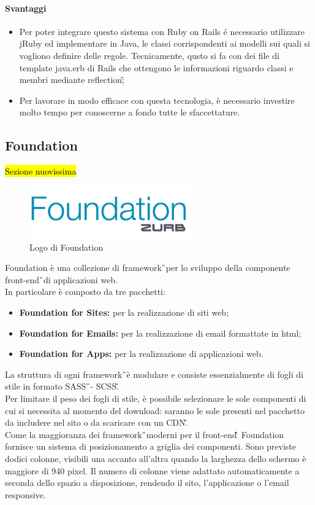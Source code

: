 \paragraph{Svantaggi}
	\begin{itemize}
		\item Per poter integrare questo sistema con Ruby on Rails é necessario utilizzare jRuby ed implementare in Java, le classi corrispondenti ai modelli sui quali si vogliono definire delle regole. Tecnicamente, qusto si fa con dei file di template java.erb di Rails che ottengono le informazioni riguardo classi e membri mediante \gls{reflection}\G;
		\item Per lavorare in modo efficace con questa tecnologia, è necessario investire molto tempo per conoscerne a fondo tutte le sfaccettature.
	\end{itemize}
\subsection{Foundation}
	\hl{Sezione nuovissima}
		\begin{figure}[H]
			\begin{center}
				\includegraphics[width=7cm]{Pics/logo-foundation.png}
				\caption{Logo di Foundation}
				\label{fig:FoundationLogo}
			\end{center}
		\end{figure}
	Foundation è una collezione di \gls{framework}\G\ per lo sviluppo della componente \gls{front-end}\G\ di applicazioni web. \\ In particolare è composto da tre pacchetti:
	\begin{itemize}
		\item \textbf{Foundation for Sites: } per la realizzazione di siti web;
		\item \textbf{Foundation for Emails: } per la realizzazione di email formattate in html;
		\item \textbf{Foundation for Apps: } per la realizzazione di applicazioni web.
	\end{itemize}
	La struttura di ogni \gls{framework}\G\ è modulare e consiste essenzialmente di fogli di stile in formato \gls{SASS}\G\ - \gls{SCSS}\G. \\
	Per limitare il peso dei fogli di stile, è possibile selezionare  le sole componenti di cui si necessita al momento del download: saranno le sole presenti nel pacchetto da includere nel sito o da scaricare con un \gls{CDN}\G. \\
	Come la maggioranza dei \gls{framework}\G\ moderni per il \gls{front-end}\G\, Foundation fornisce un sistema di posizionamento a griglia dei componenti. Sono previste dodici colonne, visibili una accanto all'altra quando la larghezza dello schermo è maggiore di 940 pixel. Il numero di colonne viene adattato automaticamente a seconda dello spazio a disposizione, rendendo il sito, l'applicazione o l'email responsive. 
